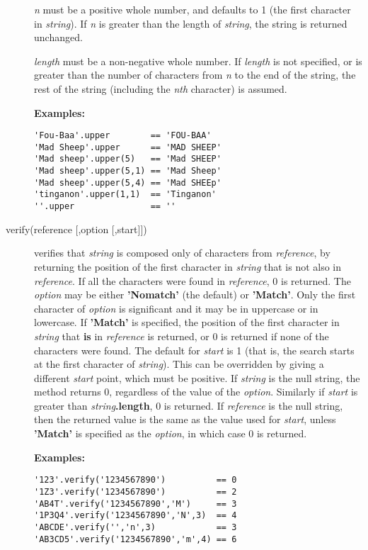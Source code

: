 \begin{description}
\emph{n} must be a positive whole number, and defaults to 1 (the
first character in \emph{string}).  If \emph{n} is greater than
the length of \emph{string}, the string is returned unchanged.
 
\emph{length} must be a non-negative whole number.
If \emph{length} is not specified, or is greater than the number of
characters from \emph{n} to the end of the string, the rest of the
string (including the \emph{n}\emph{th} character) is assumed.
 
\textbf{Examples:}
\begin{lstlisting}
'Fou-Baa'.upper        == 'FOU-BAA'
'Mad Sheep'.upper      == 'MAD SHEEP'
'Mad sheep'.upper(5)   == 'Mad SHEEP'
'Mad sheep'.upper(5,1) == 'Mad Sheep'
'Mad sheep'.upper(5,4) == 'Mad SHEEp'
'tinganon'.upper(1,1)  == 'Tinganon'
''.upper               == ''
\end{lstlisting}

\item[verify(reference [,option [,start{]]})]\label{refverify}
verifies that \emph{string} is composed only of characters
from \emph{reference}, by returning the position of the first
character in \emph{string} that is not also in
\emph{reference}.  If all the characters were found in
\emph{reference}, 0 is returned.
 The \emph{option} may be either \textbf{'Nomatch'} (the
default) or \textbf{'Match'}.  Only the first character of
\emph{option} is significant and it may be in uppercase or in
lowercase.
If \textbf{'Match'} is specified, the position of the first character
in \emph{string} that \textbf{is} in \emph{reference} is
returned, or 0 is returned if none of the characters were found.
 The default for \emph{start} is 1 (that is, the search starts at
the first character of \emph{string}).
This can be overridden by giving a different \emph{start} point,
which must be positive.
 If \emph{string} is the null string, the method returns 0,
regardless of the value of the \emph{option}.
Similarly if \emph{start} is greater than
\emph{string}\textbf{.length}, 0 is returned.
 If \emph{reference} is the null string, then the returned value
is the same as the value used for \emph{start},
unless \textbf{'Match'} is specified as the \emph{option}, in
which case 0 is returned.
 
\textbf{Examples:}
\begin{lstlisting}
'123'.verify('1234567890')          == 0
'1Z3'.verify('1234567890')          == 2
'AB4T'.verify('1234567890','M')     == 3
'1P3Q4'.verify('1234567890','N',3)  == 4
'ABCDE'.verify('','n',3)            == 3
'AB3CD5'.verify('1234567890','m',4) == 6
\end{lstlisting}


\end{description}
